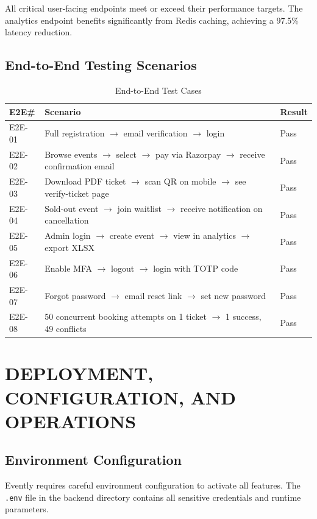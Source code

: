 \documentclass[12pt,a4paper]{report}
\begin{document}
All critical user-facing endpoints meet or exceed their performance targets. The analytics endpoint benefits significantly from Redis caching, achieving a 97.5\% latency reduction.

\section{End-to-End Testing Scenarios}

\begin{table}[H]
    \centering
    \caption{End-to-End Test Cases}
    \vspace{0.2cm}
    \begin{tabular}{|p{1.5cm}|p{5.5cm}|p{5.5cm}|}
        \hline
        \textbf{E2E\#} & \textbf{Scenario} & \textbf{Result} \\
        \hline
        E2E-01 & Full registration $\to$ email verification $\to$ login & Pass \\
        \hline
        E2E-02 & Browse events $\to$ select $\to$ pay via Razorpay $\to$ receive confirmation email & Pass \\
        \hline
        E2E-03 & Download PDF ticket $\to$ scan QR on mobile $\to$ see verify-ticket page & Pass \\
        \hline
        E2E-04 & Sold-out event $\to$ join waitlist $\to$ receive notification on cancellation & Pass \\
        \hline
        E2E-05 & Admin login $\to$ create event $\to$ view in analytics $\to$ export XLSX & Pass \\
        \hline
        E2E-06 & Enable MFA $\to$ logout $\to$ login with TOTP code & Pass \\
        \hline
        E2E-07 & Forgot password $\to$ email reset link $\to$ set new password & Pass \\
        \hline
        E2E-08 & 50 concurrent booking attempts on 1 ticket $\to$ 1 success, 49 conflicts & Pass \\
        \hline
    \end{tabular}
\end{table}
\chapter{DEPLOYMENT, CONFIGURATION, AND OPERATIONS}

\section{Environment Configuration}
Evently requires careful environment configuration to activate all features. The \texttt{.env} file in the backend directory contains all sensitive credentials and runtime parameters.
\end{document}
